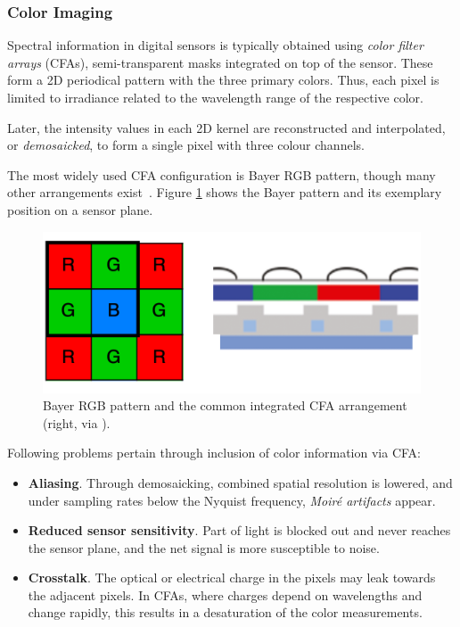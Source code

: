 \subsubsection{Color Imaging}

Spectral information in digital sensors is typically obtained using \textit{color filter arrays} (CFAs), semi-transparent masks integrated on top of the sensor. These form a 2D periodical pattern with the three primary colors. Thus, each pixel is limited to irradiance related to the wavelength range of the respective color.

Later, the intensity values in each 2D kernel are reconstructed and interpolated, or \textit{demosaicked}, to form a single pixel with three colour channels.

The most widely used CFA configuration is Bayer RGB pattern, though many other arrangements exist~\cite{Krig2014}. Figure \ref{fig:cfabayer} shows the Bayer pattern and its exemplary position on a sensor plane.

\begin{figure}[h]
  \centering
  \includegraphics[width=0.8\linewidth]{imgs/cfa/cfabayer.png}
  \caption{Bayer RGB pattern and the common integrated CFA arrangement (right, via \cite{Krig2014}).}
  \label{fig:cfabayer}
\end{figure}

Following problems pertain through inclusion of color information via CFA:

\begin{itemize}

\item \textbf{Aliasing}. Through demosaicking, combined spatial resolution is lowered, and under sampling rates below the Nyquist frequency, \textit{Moiré artifacts} appear.

\item \textbf{Reduced sensor sensitivity}. Part of light is blocked out and never reaches the sensor plane, and the net signal is more susceptible to noise.

\item \textbf{Crosstalk}. The optical or electrical charge in the pixels may leak towards the adjacent pixels. In CFAs, where charges depend on wavelengths and change rapidly, this results in a desaturation of the color measurements.
\end{itemize}

